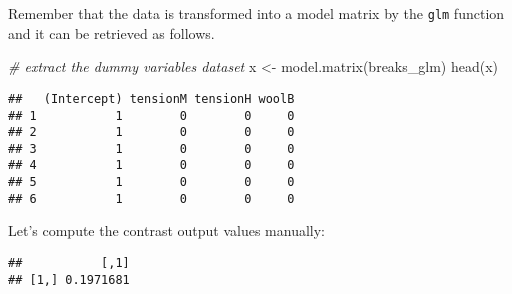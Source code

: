 \documentclass[
  oneside]{book}
\newenvironment{Shaded}{\begin{snugshade}}{\end{snugshade}}
\newcommand{\CommentTok}[1]{\textcolor[rgb]{0.56,0.35,0.01}{\textit{#1}}}
\newcommand{\DecValTok}[1]{\textcolor[rgb]{0.00,0.00,0.81}{#1}}
\newcommand{\FunctionTok}[1]{\textcolor[rgb]{0.00,0.00,0.00}{#1}}
\newcommand{\NormalTok}[1]{#1}
\newcommand{\OtherTok}[1]{\textcolor[rgb]{0.56,0.35,0.01}{#1}}
\newcommand{\SpecialCharTok}[1]{\textcolor[rgb]{0.00,0.00,0.00}{#1}}
\begin{document}
Remember that the data is transformed into a model matrix
by the \texttt{glm} function and it can be retrieved as follows.

\begin{Shaded}
\begin{Highlighting}[]
\CommentTok{\# extract the dummy variables dataset}
\NormalTok{x }\OtherTok{\textless{}{-}} \FunctionTok{model.matrix}\NormalTok{(breaks\_glm)}
\FunctionTok{head}\NormalTok{(x)}
\end{Highlighting}
\end{Shaded}

\begin{verbatim}
##   (Intercept) tensionM tensionH woolB
## 1           1        0        0     0
## 2           1        0        0     0
## 3           1        0        0     0
## 4           1        0        0     0
## 5           1        0        0     0
## 6           1        0        0     0
\end{verbatim}

Let's compute the contrast output values manually:

\begin{Shaded}
\end{Shaded}

\begin{verbatim}
##           [,1]
## [1,] 0.1971681
\end{verbatim}

\begin{Shaded}
\end{Shaded}
\end{document}
